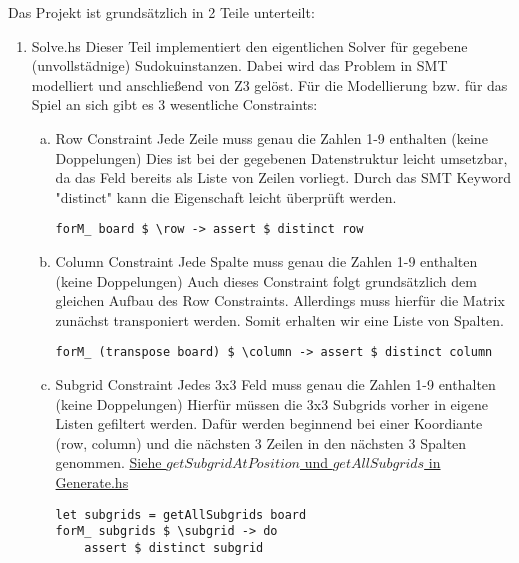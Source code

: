 Das Projekt ist grundsätzlich in 2 Teile unterteilt:
\begin{enumerate}[(1)]
    \item Solve.hs \newline
    Dieser Teil implementiert den eigentlichen Solver für gegebene (unvollstädnige) Sudokuinstanzen. Dabei wird das Problem in SMT modelliert und anschließend von Z3 gelöst. Für die Modellierung bzw. für das Spiel an sich gibt es 3 wesentliche Constraints:
        \begin{enumerate}[(a)]
            \item Row Constraint \newline
            Jede Zeile muss genau die Zahlen 1-9 enthalten (keine Doppelungen)\newline
            Dies ist bei der gegebenen Datenstruktur leicht umsetzbar, da das Feld bereits als Liste von Zeilen vorliegt. Durch das SMT Keyword "distinct" kann die Eigenschaft leicht überprüft werden. \newline
            \begin{lstlisting}
forM_ board $ \row -> assert $ distinct row
            \end{lstlisting}
            \item Column Constraint \newline
            Jede Spalte muss genau die Zahlen 1-9 enthalten (keine Doppelungen) \newline
            Auch dieses Constraint folgt grundsätzlich dem gleichen Aufbau des Row Constraints. Allerdings muss hierfür die Matrix zunächst transponiert werden. Somit erhalten wir eine Liste von Spalten.
            \begin{lstlisting}
forM_ (transpose board) $ \column -> assert $ distinct column
            \end{lstlisting}
            \item Subgrid Constraint \newline
            Jedes 3x3 Feld muss genau die Zahlen 1-9 enthalten (keine Doppelungen) \newline
            Hierfür müssen die 3x3 Subgrids vorher in eigene Listen gefiltert werden. Dafür werden beginnend bei einer Koordiante (row, column) und die nächsten 3 Zeilen in den nächsten 3 Spalten genommen. \underline{Siehe \(getSubgridAtPosition\) und \(getAllSubgrids\) in Generate.hs}
            \begin{lstlisting}
let subgrids = getAllSubgrids board
forM_ subgrids $ \subgrid -> do
    assert $ distinct subgrid
            \end{lstlisting}
        \end{enumerate}


\end{enumerate}
